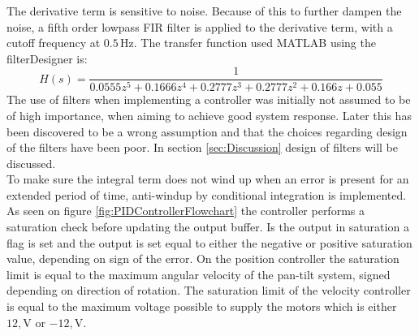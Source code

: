 \documentclass[../../main.tex]{subfiles}
\begin{document}
The derivative term is sensitive to noise. Because of this to further dampen the noise, a fifth order lowpass FIR filter is applied to the derivative term, with a cutoff frequency at $0.5\,\mathrm{Hz}$. The transfer function used MATLAB using the filterDesigner is:
\begin{equation}
    H(s) = \frac{1}{0.0555z^5 + 0.1666z^4 + 0.2777z^3 + 0.2777z^2 + 0.166z + 0.055}
\end{equation}
The use of filters when implementing a controller was initially not assumed to be of high importance, when aiming to achieve good system response. Later this has been discovered to be a wrong assumption and that the choices regarding design of the filters have been poor. In section \ref{sec:Discussion} design of filters will be discussed. \\




To make sure the integral term does not wind up when an error is present for an extended period of time, anti-windup by conditional integration is implemented. As seen on figure \ref{fig:PIDControllerFlowchart} the controller performs a saturation check before updating the output buffer. Is the output in saturation a flag is set and the output is set equal to either the negative or positive saturation value, depending on sign of the error. On the position controller the saturation limit is equal to the maximum angular velocity of the pan-tilt system, signed depending on direction of rotation. The saturation limit of the velocity controller is equal to the maximum voltage possible to supply the motors which is either $12,\mathrm{V}$ or $-12,\mathrm{V}$.
\end{document}
